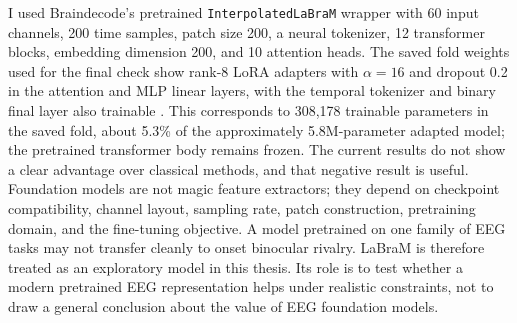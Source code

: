 \documentclass[11pt,a4paper,chapterprefix=false,parskip=false]{scrreprt}
\begin{document}
I used Braindecode's pretrained \texttt{InterpolatedLaBraM} wrapper with 60 input channels, 200 time samples, patch size 200, a neural tokenizer, 12 transformer blocks, embedding dimension 200, and 10 attention heads. The saved fold weights used for the final check show rank-8 LoRA adapters with $\alpha=16$ and dropout 0.2 in the attention and MLP linear layers, with the temporal tokenizer and binary final layer also trainable \citep{hu_lora_2022}. This corresponds to 308,178 trainable parameters in the saved fold, about 5.3\% of the approximately 5.8M-parameter adapted model; the pretrained transformer body remains frozen. The current results do not show a clear advantage over classical methods, and that negative result is useful. Foundation models are not magic feature extractors; they depend on checkpoint compatibility, channel layout, sampling rate, patch construction, pretraining domain, and the fine-tuning objective. A model pretrained on one family of EEG tasks may not transfer cleanly to onset binocular rivalry. LaBraM is therefore treated as an exploratory model in this thesis. Its role is to test whether a modern pretrained EEG representation helps under realistic constraints, not to draw a general conclusion about the value of EEG foundation models.
\end{document}
